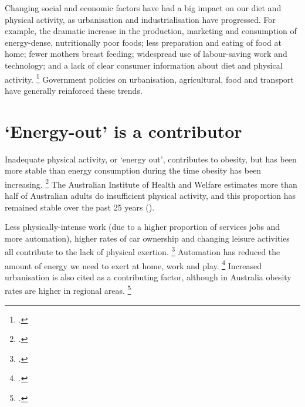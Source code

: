 \documentclass[embargoed]{grattan}
\begin{document}
Changing social and economic factors have had a big impact on our diet and physical activity, as urbanisation and industrialisation have progressed.
For example, the dramatic increase in the production, marketing and consumption of energy-dense, nutritionally poor foods; less preparation and eating of food at home; fewer mothers breast feeding; widespread use of labour-saving work and technology; and a lack of clear consumer information about diet and physical activity.%
\footcites{Livingston2012JAMAobesitytheme}{Ewart-Pierce2016WholeCommunityObesity}{Roberto2015Patchyprogressobesity}{Keith2006Putativecontributorssecular}{Wright2012Causesobesity}{Lakdawalla2009growthobesitytechnological}{Popkin2004nutritiontransitionworldwide}{Popkin2001nutritiontransitionobesity}{Karnani2016ObesityCrisisas}{Bray2004Consumptionhighfructose}{Organisation2000Obesitypreventingmanaging}{Swinburn2004Dietnutritionprevention} Government policies on urbanisation, agricultural, food and transport have generally reinforced these trends.



\section{`Energy-out' is a contributor }\label{energy-out-is-a-contributor}

Inadequate physical activity, or `energy out', contributes to obesity, but has been more stable than energy consumption during the time obesity has been increasing.%
\footcites{Keith2006Putativecontributorssecular}{Popkin2004nutritiontransitionworldwide}{Wikland2016}{Stubbs2004obesityepidemicboth} The Australian Institute of Health and Welfare estimates more than half of Australian adults do insufficient physical activity, and this proportion has remained stable over the past 25 years ().

Less physically-intense work (due to a higher proportion of services jobs and more automation), higher rates of car ownership and changing leisure activities all contribute to the lack of physical exertion. \footcites{Popkin2004nutritiontransitionworldwide}{Finkelstein2010EconomicsObesity}{Popkin1998obesityepidemicis}{Drewnowski1997nutritiontransitionnew} Automation has reduced the amount of energy we need to exert at home, work and play.%
\footcites{Caballero2007globalepidemicobesity}{Popkin2004nutritiontransitionworldwide} Increased urbanisation is also cited as a contributing factor, although in Australia obesity rates are higher in regional areas.%
\footcites{ABS2013436405503AustralianHealth}{Popkin1998obesityepidemicis}{Drewnowski1997nutritiontransitionnew}
\end{document}
